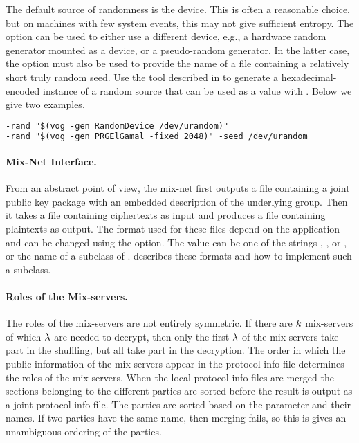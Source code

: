 \documentclass[11pt]{article}
\begin{document}
The default source of randomness is the 
device. This is often a reasonable choice, but on machines with few
system events, this may not give sufficient entropy. The 
option can be used to either use a different device, e.g., a hardware
random generator mounted as a device, or a pseudo-random generator. In
the latter case, the  option must also be used to provide
the name of a file containing a relatively short truly random
seed. Use the \vog{} tool described in  to generate a
hexadecimal-encoded instance of a random source that can be used as a
value with . Below we give two examples.

\vspace{0.3cm}
\begin{lstlisting}[frame=single,language=xml,
basicstyle=\tt,showstringspaces=false]
-rand "$(vog -gen RandomDevice /dev/urandom)"
-rand "$(vog -gen PRGElGamal -fixed 2048)" -seed /dev/urandom
\end{lstlisting}


\paragraph{Mix-Net Interface.}

From an abstract point of view, the mix-net first outputs a file
containing a joint public key package with an embedded description of
the underlying group. Then it takes a file containing ciphertexts as
input and produces a file containing plaintexts as output. The format
used for these files depend on the application and can be changed
using the  option. The value can be one of the strings
, , or , or the name of a subclass
of
. 
describes these formats and how to implement such a subclass.


\paragraph{Roles of the Mix-servers.}

The roles of the mix-servers are not entirely symmetric. If there are
$k$ mix-servers of which $\lambda$ are needed to decrypt, then only
the first $\lambda$ of the mix-servers take part in the shuffling, but
all take part in the decryption. The order in which the public
information of the mix-servers appear in the protocol info file
determines the roles of the mix-servers. When the local protocol info
files are merged the sections belonging to the different parties are
sorted before the result is output as a joint protocol info file. The
parties are sorted based on the  parameter and their
names. If two parties have the same name, then merging fails, so this
is gives an unambiguous ordering of the parties.
\end{document}
